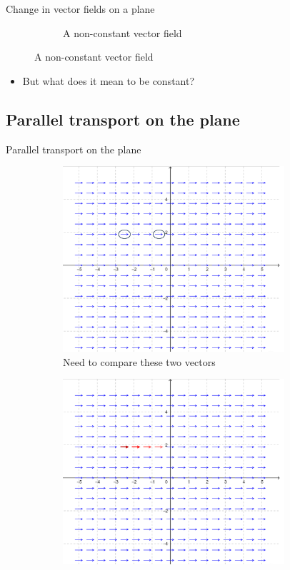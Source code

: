 \documentclass{beamer}
\begin{document}
\begin{frame}{Change in vector fields on a plane}
\begin{figure}[h!]
\begin{subfigure}{.5\textwidth}
        \caption{A non-constant vector field}
        \label{fig:sub2}
    \end{subfigure}  
\end{figure}
\begin{itemize}
    \item But what does it mean to be constant?
\end{itemize}
\end{frame}

\subsection{Parallel transport on the plane}
\begin{frame}{Parallel transport on the plane}
    \begin{figure}[h!]
        \begin{subfigure}{.5\textwidth}
            \centering  
            \includegraphics[width=0.9\textwidth]{images/vector_field_3.png}
            \caption{Need to compare these two vectors}
            \label{fig:sub3}
          \end{subfigure}%
          \begin{subfigure}{.5\textwidth}
            \centering   
            \includegraphics[width=0.9\textwidth]{images/vector_field_4.png}

\end{subfigure}
\end{figure}
\end{frame}
\end{document}
